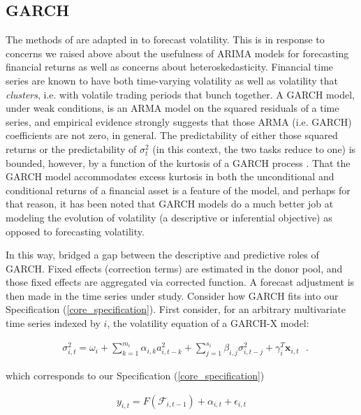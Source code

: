 \documentclass{uiucthesis2021}
\newcommand{\xx}{\textbf{x}}
\theoremstyle{definition}
\begin{document}
  \subsection{GARCH}
  The methods of \cite[][]{lin2021minimizing} are adapted in \cite[][]{lundquist2024volatility} to forecast volatility.  This is in response to concerns we raised above about the usefulness of ARIMA models for forecasting financial returns as well as concerns about heteroskedasticity.  Financial time series are known to have both time-varying volatility as well as  volatility that \textit{clusters}, i.e. with volatile trading periods that bunch together.  A GARCH model, under weak conditions, is an ARMA model on the squared residuals of a time series, and empirical evidence strongly suggests that those ARMA (i.e. GARCH) coefficients are not zero, in general.  The predictability of either those squared returns or the predictability of $\sigma_{t}^{2}$ (in this context, the two tasks reduce to one) is bounded, however, by a function of the kurtosis of a GARCH process \parencite[][]{francq2019garch}.  That the GARCH model accommodates excess kurtosis in both the unconditional and conditional returns of a financial asset is a feature of the model, and perhaps for that reason, it has been noted that GARCH models do a much better job at modeling the evolution of volatility (a descriptive or inferential objective) as opposed to forecasting volatility.
  
  In this way, \cite[][]{lundquist2024volatility} bridged a gap between the descriptive and predictive roles of GARCH.  Fixed effects (correction terms) are estimated in the donor pool, and those fixed effects are aggregated via corrected function.  A forecast adjustment is then made in the time series under study.  Consider how GARCH fits into our Specification (\ref{core_specification}).  First consider, for an arbitrary multivariate time series indexed by $i$, the volatility equation of a GARCH-X model:
  
  \begin{align}
    &\sigma_{i,t}^{2} = \omega_{i} + \sum^{m_{i}}_{k=1}\alpha_{i,k}a^{2}_{i,t-k} + \sum_{j=1}^{s_{i}}\beta_{i,j}\sigma_{i,t-j}^{2} + \gamma_{i}^{T} \xx_{i,t} \text{ }.\label{GARCH_intro}
    \end{align}
  
  which corresponds to our Specification (\ref{core_specification})
  
    \begin{align*}
        y_{i,t} = F(\mathcal{F}_{i,t-1}) + \alpha_{i,t} + \epsilon_{i,t}
      \end{align*}
  
\end{document}
